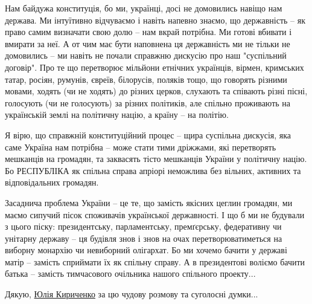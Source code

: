\zzrule

Нам байдужа конституція, бо ми, українці, досі не домовились навіщо нам
держава. Ми інтуїтивно відчуваємо і навіть напевно знаємо, що державність – як
право самим визначати свою долю – нам вкрай потрібна. Ми готові вбивати і
вмирати за неї. А от чим має бути наповнена ця державність ми не тільки не
домовились – ми навіть не почали справжню дискусію про наш "суспільний
договір". Про те що перетворює мільйони етнічних українців, вірмен, кримських
татар, росіян, румунів, євреїв, білорусів, поляків тощо, що говорять різними
мовами, ходять (чи не ходять) до різних церков, слухають та співають різні
пісні, голосують (чи не голосують) за різних політиків, але спільно проживають
на українській землі на політичну націю, а країну – на політію. 

Я вірю, що справжній конституційний процес – щира суспільна дискусія, яка саме
Україна нам потрібна – може стати тими дріжжами, які перетворять мешканців на
громадян, та заквасять тісто мешканців України у політичну націю. Бо РЕСПУБЛІКА
як спільна справа апріорі неможлива без вільних, активних та відповідальних
громадян. 

Засаднича проблема України – це те, що замість якісних цеглин громадян, ми
маємо сипучий пісок споживачів української державності. І що б ми не будували з
цього піску: президентську, парламентську, премґєрську, федеративну чи унітарну
державу – ця будівля знов і знов на очах перетворюватиметься на виборну
монархію чи невиборний олігархат. Бо ми хочемо бачити у державі матір – замість
сприймати їх як спільну справу. А в президентові воліємо бачити батька –
замість тимчасового очільника нашого спільного проекту...

Дякую, \href{https://www.facebook.com/juliakyr}{Юлія Кириченко} за цю чудову
розмову та суголосні думки...


